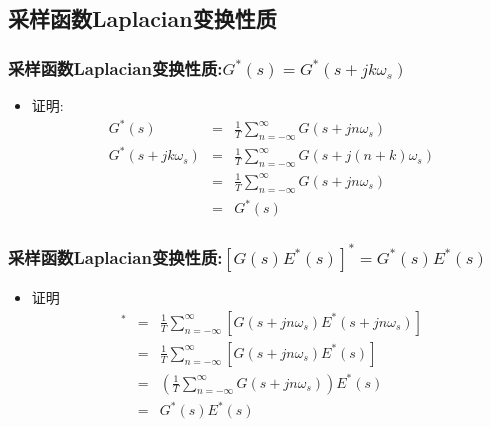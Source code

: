 \documentclass[table]{article}
\begin{document}
\subsection{采样函数Laplacian变换性质}
\label{sec-2-2}
\begin{frame}
\frametitle{采样函数Laplacian变换性质:$G^*(s)=G^*(s+jk\omega_s)$}
\label{sec-2-2-1}

\begin{itemize}
\item <2-> 证明:
      \begin{eqnarray*}
      G^*(s) &=& \frac{1}{T}\sum_{n=-\infty}^{\infty}G(s+jn\omega_s) \\
      G^*(s+jk\omega_s) &=& \frac{1}{T}\sum_{n=-\infty}^{\infty}G(s+j(n+k)\omega_s) \\
       &=& \frac{1}{T}\sum_{n=-\infty}^{\infty}G(s+jn\omega_s)\\
       &=& G^*(s)
      \end{eqnarray*}
\end{itemize}
\end{frame}
\begin{frame}
\frametitle{采样函数Laplacian变换性质:$[G(s)E^*(s)]^*=G^*(s)E^*(s)$}
\label{sec-2-2-2}

\begin{itemize}
\item <2-> 证明
      \begin{eqnarray*}
      [G(s)E^*(s)]^* &= & \frac{1}{T}\sum_{n=-\infty}^{\infty}[G(s+jn\omega_s)E^*(s+jn\omega_s)] \\
       &=& \frac{1}{T}\sum_{n=-\infty}^{\infty}[G(s+jn\omega_s)E^*(s)] \\
       &=& (\frac{1}{T}\sum_{n=-\infty}^{\infty}G(s+jn\omega_s))E^*(s) \\
       &=& G^*(s)E^*(s)
      \end{eqnarray*}
\end{itemize}
\end{frame}
\end{document}

